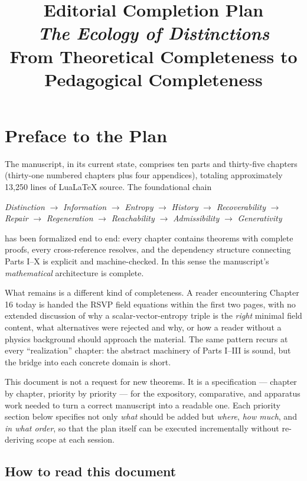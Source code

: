 \documentclass[11pt]{report}
\title{\Huge Editorial Completion Plan\\[0.3em]
  \Large \textit{The Ecology of Distinctions}\\[0.3em]
  \large From Theoretical Completeness to Pedagogical Completeness}
\author{}
\date{}
\begin{document}
\maketitle
\tableofcontents

\chapter*{Preface to the Plan}

The manuscript, in its current state, comprises ten parts and
thirty-five chapters (thirty-one numbered chapters plus four
appendices), totaling approximately 13{,}250 lines of LuaLaTeX
source. The foundational chain

\begin{center}
\textit{Distinction} $\to$ \textit{Information} $\to$
\textit{Entropy} $\to$ \textit{History} $\to$
\textit{Recoverability} $\to$ \textit{Repair} $\to$
\textit{Regeneration} $\to$ \textit{Reachability} $\to$
\textit{Admissibility} $\to$ \textit{Generativity}
\end{center}

has been formalized end to end: every chapter contains
theorems with complete proofs, every cross-reference resolves,
and the dependency structure connecting Parts I--X is explicit
and machine-checked. In this sense the manuscript's
\emph{mathematical} architecture is complete.

What remains is a different kind of completeness. A reader
encountering Chapter 16 today is handed the RSVP field
equations within the first two pages, with no extended
discussion of why a scalar-vector-entropy triple is the
\emph{right} minimal field content, what alternatives were
rejected and why, or how a reader without a physics background
should approach the material. The same pattern recurs at every
``realization'' chapter: the abstract machinery of Parts I--III
is sound, but the bridge into each concrete domain is short.

This document is not a request for new theorems. It is a
specification --- chapter by chapter, priority by priority ---
for the expository, comparative, and apparatus work needed to
turn a correct manuscript into a readable one. Each priority
section below specifies not only \emph{what} should be added
but \emph{where}, \emph{how much}, and \emph{in what order},
so that the plan itself can be executed incrementally without
re-deriving scope at each session.

\section*{How to read this document}
\end{document}

